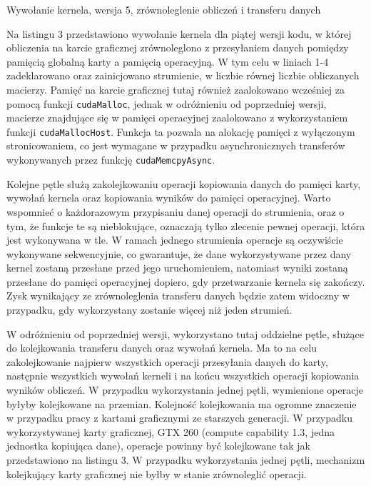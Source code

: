 \documentclass[12pt,a4paper]{article}
\begin{document}
\begin{listing}[H]
\inputminted{cuda}{listings/invocation_async.cu}
\caption{Wywołanie kernela, wersja 5, zrównoleglenie obliczeń i transferu danych}
\label{lst:async}
\end{listing}

Na listingu 3 przedstawiono wywołanie kernela dla piątej wersji kodu, w której obliczenia na karcie graficznej zrównoleglono z przesyłaniem danych pomiędzy pamięcią globalną karty a pamięcią operacyjną. W tym celu w liniach 1-4 zadeklarowano oraz zainicjowano strumienie, w liczbie równej liczbie obliczanych macierzy. Pamięć na karcie graficznej tutaj również zaalokowano wcześniej za pomocą funkcji \verb|cudaMalloc|, jednak w odróżnieniu od poprzedniej wersji, macierze znajdujące się w pamięci operacyjnej zaalokowano z wykorzystaniem funkcji \verb|cudaMallocHost|. Funkcja ta pozwala na alokację pamięci z wyłączonym stronicowaniem, co jest wymagane w przypadku asynchronicznych transferów wykonywanych przez funkcję \verb|cudaMemcpyAsync|.

Kolejne pętle służą zakolejkowaniu operacji kopiowania danych do pamięci karty, wywołań kernela oraz kopiowania wyników do pamięci operacyjnej. Warto wspomnieć o każdorazowym przypisaniu danej operacji do strumienia, oraz o tym, że funkcje te są nieblokujące, oznaczają tylko zlecenie pewnej operacji, która jest wykonywana w tle. W ramach jednego strumienia operacje są oczywiście wykonywane sekwencyjnie, co gwarantuje, że dane wykorzystywane przez dany kernel zostaną przesłane przed jego uruchomieniem, natomiast wyniki zostaną przesłane do pamięci operacyjnej dopiero, gdy przetwarzanie kernela się zakończy. Zysk wynikający ze zrównoleglenia transferu danych będzie zatem widoczny w przypadku, gdy wykorzystany zostanie więcej niż jeden strumień.

W odróżnieniu od poprzedniej wersji, wykorzystano tutaj oddzielne pętle, służące do kolejkowania transferu danych oraz wywołań kernela. Ma to na celu zakolejkowanie najpierw wszystkich operacji przesyłania danych do karty, następnie wszystkich wywołań kerneli i na końcu wszystkich operacji kopiowania wyników obliczeń. W przypadku wykorzystania jednej pętli, wymienione operacje byłyby kolejkowane na przemian. Kolejność kolejkowania ma ogromne znaczenie w przypadku pracy z kartami graficznymi ze starszych generacji. W przypadku wykorzystywanej karty graficznej, GTX 260 (compute capability 1.3, jedna jednostka kopiująca dane), operacje powinny być kolejkowane tak jak przedstawiono na listingu 3. W przypadku wykorzystania jednej pętli, mechanizm kolejkujący karty graficznej nie byłby w stanie zrównoleglić operacji.
\end{document}
